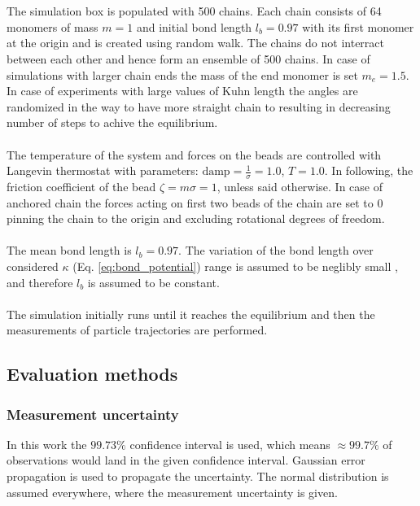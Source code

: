 \documentclass[
    paper=A4,pagesize=automedia,fontsize=12pt,
    BCOR=15mm,DIV=22,
    twoside,headinclude,footinclude=false,
    fleqn,             %
    bibliography=totocnumbered,          %
    listof=totoc,                %
    listof=flat,                 %
    cleardoublepage=empty      %
    numbers=endperiod
]{scrartcl}
\begin{document}
\\
\\
The simulation box is populated with 500 chains. Each chain consists of 64 monomers of mass $m=1$
and initial bond length $l_b=0.97$ with its first monomer at the origin
and is created using random walk. 
The chains do not interract between each other and hence form
an ensemble of 500 chains. In case of simulations with larger chain ends 
the mass of the end monomer
is set $m_e=1.5$. In case of experiments with large values of Kuhn length the 
angles are randomized in 
the way to have more straight chain to resulting in decreasing number of 
steps to achive the equilibrium.
\\
\\
The temperature of the system and forces on the beads are controlled with
Langevin thermostat with parameters: $\text{damp}=\frac{1}{\sigma}=1.0$, $T=1.0$. 
In following, the friction coefficient of the bead $\zeta = m \sigma = 1$, 
unless said otherwise.
In case of anchored
chain the forces acting on first two beads of the chain are set to 0 pinning the chain to the origin
and excluding rotational degrees of freedom.
\\
\\
The mean bond length is $l_b=0.97$. The variation of the bond length over considered 
$\kappa$ (Eq. \ref{eq:bond_potential}) range is assumed to be 
neglibly small \cite{svaneborg_2020}, and therefore $l_b$ is assumed to be constant.   
\\
\\
The simulation initially runs until it reaches the equilibrium and then the measurements
of particle trajectories are performed. 


\subsection{Evaluation methods}

\subsubsection{Measurement uncertainty}
In this work the $99.73 \%$ confidence interval is used, which means
$\approx99.7 \%$ of observations would land in the given confidence interval.
Gaussian error propagation is used to propagate the uncertainty. The normal
distribution is assumed everywhere, where the measurement uncertainty is given.
\end{document}
